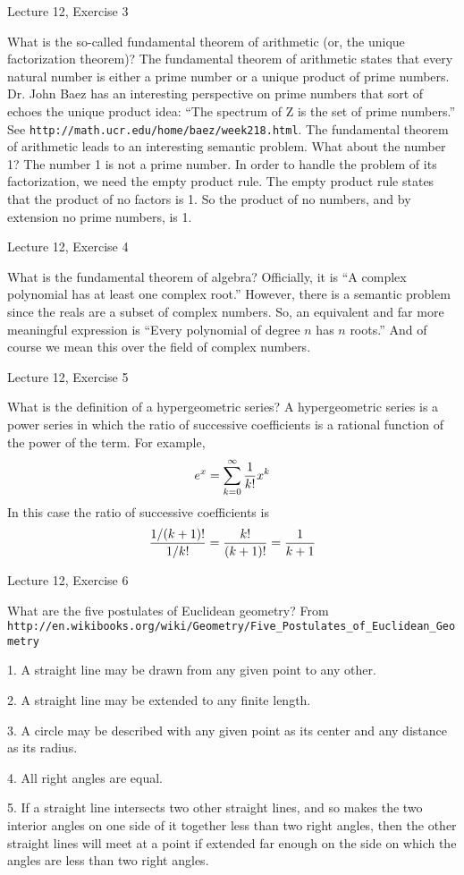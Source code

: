 \beginsection Lecture 12, Exercise 3

What is the so-called fundamental theorem of arithmetic (or,
the unique factorization theorem)?
\medskip\noindent
The fundamental theorem of arithmetic states that every natural
number is either a prime number or a unique product of prime numbers.
Dr. John Baez has an interesting perspective on prime numbers that
sort of echoes the unique product idea:
``The spectrum of Z is the set of prime numbers.''
See {\tt http://math.ucr.edu/home/baez/week218.html}.
The fundamental theorem of arithmetic leads to an interesting
semantic problem. What about the number 1?
The number 1 is not a prime number.
In order to handle the problem of its factorization,
we need the empty product rule.
The empty product rule states that the product of no
factors is 1.
So the product of no numbers,
and by extension no prime numbers, is 1.

\beginsection Lecture 12, Exercise 4

What is the fundamental theorem of algebra?
\medskip\noindent
Officially, it is ``A complex polynomial has at least one complex root.''
However, there is a semantic problem since the reals are a subset
of complex numbers. So, an equivalent and far more meaningful expression is
``Every polynomial of degree $n$ has $n$ roots.''
And of course we mean this over the field of complex numbers.

\beginsection Lecture 12, Exercise 5

What is the definition of a hypergeometric series?
\medskip\noindent
A hypergeometric series is a power series in which the ratio of
successive coefficients is a rational function of the power of the term.
For example,
$$e^x=\sum_{k=0}^\infty {1\over k!}x^k$$
In this case the ratio of successive coefficients is
$${1/(k+1)!\over1/k!}={k!\over(k+1)!}={1\over k+1}$$

\beginsection Lecture 12, Exercise 6

What are the five postulates of Euclidean geometry?
\medskip\noindent
From {\tt http://en.wikibooks.org/wiki/Geometry/Five\_Postulates\_of\_Euclidean\_Geometry}
\item{1.} A straight line may be drawn from any given point to any other.
\item{2.} A straight line may be extended to any finite length.
\item{3.} A circle may be described with any given point as its center and any distance
as its radius.
\item{4.} All right angles are equal.
\item{5.} If a straight line intersects two other straight lines, and so makes the two
interior angles on one side of it together less than two right angles, then the other
straight lines will meet at a point if extended far enough on the side on which the
angles are less than two right angles.


